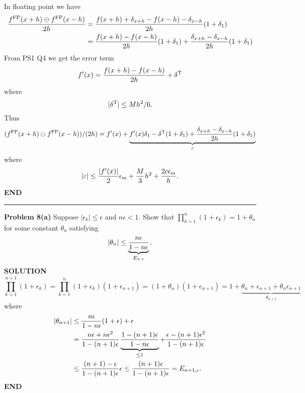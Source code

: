 \documentclass[12pt,a4paper]{article}
\begin{document}
In floating point we have
\begin{align*}
{f^{\rm FP}(x + h) \ensuremath{\ominus} f^{\rm FP}(x-h) \over 2h} &= {f(x + h) +  \ensuremath{\delta}_{x+h} - f(x-h) - \ensuremath{\delta}_{x-h} \over 2h} (1 + \ensuremath{\delta}_1) \\
&= {f(x+h) - f(x-h) \over 2h} (1 + \ensuremath{\delta}_1) + {\ensuremath{\delta}_{x+h}- \ensuremath{\delta}_{x-h} \over 2h} (1 + \ensuremath{\delta}_1)
\end{align*}
From PS1 Q4 we get the error term
\[
f'(x) = {f(x + h) - f(x-h) \over 2h} + \ensuremath{\delta}^{\rm T}
\]
where
\[
|\ensuremath{\delta}^{\rm T}| \ensuremath{\leq} Mh^2/6.
\]
Thus
\[
(f^{\rm FP}(x + h) \ensuremath{\ominus} f^{\rm FP}(x-h)) / (2h) =
f'(x) + \underbrace{f'(x) \ensuremath{\delta}_1 - \ensuremath{\delta}^{\rm T} (1 + \ensuremath{\delta}_1) + {\ensuremath{\delta}_{x+h}- \ensuremath{\delta}_{x-h} \over 2h} (1 + \ensuremath{\delta}_1)}_{\ensuremath{\varepsilon}}
\]
where
\[
|\ensuremath{\varepsilon}| \ensuremath{\leq} {|f'(x)| \over 2} \ensuremath{\epsilon}_{\rm m} + {M \over 3} h^2 + {2 c \ensuremath{\epsilon}_{\rm m} \over h}.
\]
\textbf{END}

\rule{\textwidth}{1pt}
\textbf{Problem 8(a)} Suppose $|\ensuremath{\epsilon}_k| \ensuremath{\leq} \ensuremath{\epsilon}$ and $n \ensuremath{\epsilon} < 1$. Show that $\ensuremath{\prod}_{k=1}^n (1+\ensuremath{\epsilon}_k) = 1+\ensuremath{\theta}_n$ for some constant $\ensuremath{\theta}_n$ satisfying
\[
|\ensuremath{\theta}_n| \ensuremath{\leq} \underbrace{n \ensuremath{\epsilon} \over 1-n\ensuremath{\epsilon}}_{E_{n,\ensuremath{\epsilon}}}.
\]
\textbf{SOLUTION}
\[
\ensuremath{\prod}_{k=1}^{n+1} (1+\ensuremath{\epsilon}_k) = \ensuremath{\prod}_{k=1}^n (1+\ensuremath{\epsilon}_k) (1+\ensuremath{\epsilon}_{n+1}) = (1+\ensuremath{\theta}_n)(1+\ensuremath{\epsilon}_{n+1}) = 1 + \underbrace{\ensuremath{\theta}_n + \ensuremath{\epsilon}_{n+1} + \ensuremath{\theta}_n\ensuremath{\epsilon}_{n+1}}_{\ensuremath{\theta}_{n+1}}
\]
where
\begin{align*}
|\ensuremath{\theta}_{n+1}| &\ensuremath{\leq} {n \ensuremath{\epsilon} \over 1-n\ensuremath{\epsilon}}(1+\ensuremath{\epsilon}) + \ensuremath{\epsilon} \\
&={n \ensuremath{\epsilon} + n \ensuremath{\epsilon}^2 \over 1-(n+1)\ensuremath{\epsilon}} \underbrace{{1-(n+1)\ensuremath{\epsilon} \over 1-n\ensuremath{\epsilon}}}_{\ensuremath{\leq} 1}  + {\ensuremath{\epsilon}-(n+1)\ensuremath{\epsilon}^2 \over 1-(n+1)\ensuremath{\epsilon}} \\
&\ensuremath{\leq} {(n+1)  -  \ensuremath{\epsilon} \over 1-(n+1)\ensuremath{\epsilon}} \ensuremath{\epsilon} \ensuremath{\leq} {(n+1) \ensuremath{\epsilon} \over 1-(n+1)\ensuremath{\epsilon}} = E_{n+1,\ensuremath{\epsilon}}.
\end{align*}
\textbf{END}
\end{document}
